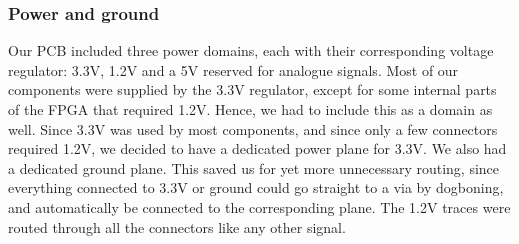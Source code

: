 \begin{itemize}
\subsubsection{Power and ground}
Our PCB included three power domains, each with their corresponding voltage regulator: 3.3V, 1.2V and a 5V reserved for analogue signals. Most of our components were supplied by the 3.3V regulator, except for some internal parts of the FPGA that required 1.2V. Hence, we had to include this as a domain as well. 
\newline
\newline
Since 3.3V was used by most components, and since only a few connectors required 1.2V, we decided to have a dedicated power plane for 3.3V. We also had a dedicated ground plane. This saved us for yet more unnecessary routing, since everything connected to 3.3V or ground could go straight to a via by dogboning, and automatically be connected to the corresponding plane. The 1.2V traces were routed through all the connectors like any other signal. 


\end{itemize}
